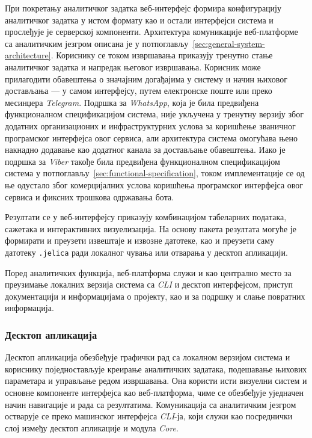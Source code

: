 \documentclass[12pt,oneside]{memoir}
\begin{document}
При покретању аналитичког задатка веб-интерфејс формира конфигурацију аналитичког задатка у истом формату као и остали интерфејси система и прослеђује је серверској компоненти. Архитектура комуникације веб-платформе са аналитичким језгром описана је у потпоглављу~\ref{sec:general-system-architecture}. Кориснику се током извршавања приказују тренутно стање аналитичког задатка и напредак његовог извршавања. Корисник може прилагодити обавештења о значајним догађајима у систему и начин њиховог достављања — у самом интерфејсу, путем електронске поште или преко месинџера \textit{Telegram}. Подршка за \textit{WhatsApp}, која је била предвиђена функционалном спецификацијом система, није укључена у тренутну верзију због додатних организационих и инфраструктурних услова за коришћење званичног програмског интерфејса овог сервиса, али архитектура система омогућава њено накнадно додавање као додатног канала за достављање обавештења. Иако је подршка за \textit{Viber} такође била предвиђена функционалном спецификацијом система у потпоглављу~\ref{sec:functional-specification}, током имплементације се од ње одустало због комерцијалних услова коришћења програмског интерфејса овог сервиса и фиксних трошкова одржавања бота.

Резултати се у веб-интерфејсу приказују комбинацијом табеларних података, сажетака и интерактивних визуелизација. На основу пакета резултата могуће је формирати и преузети извештаје и извозне датотеке, као и преузети саму датотеку \texttt{.jelica} ради локалног чувања или отварања у десктоп апликацији.

Поред аналитичких функција, веб-платформа служи и као централно место за преузимање локалних верзија система са \textit{CLI} и десктоп интерфејсом, приступ документацији и информацијама о пројекту, као и за подршку и слање повратних информација.


\subsubsection{Десктоп апликација}
Десктоп апликација обезбеђује графички рад са локалном верзијом система и кориснику поједностављује креирање аналитичких задатака, подешавање њихових параметара и управљање редом извршавања. Она користи исти визуелни систем и основне компоненте интерфејса као веб-платформа, чиме се обезбеђује уједначен начин навигације и рада са резултатима. Комуникација са аналитичким језгром остварује се преко машинског интерфејса \textit{CLI}-ја, који служи као посреднички слој између десктоп апликације и модула \textit{Core}.
\end{document}
